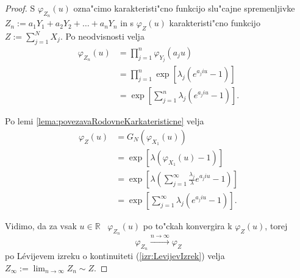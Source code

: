 \documentclass[12pt, a4paper, reqno]{amsart}
\theoremstyle{definition}
\theoremstyle{plain}
\newcommand{\R}{\mathbb{R}}
\newcommand{\1}{\mathds{1}}
\begin{document}
    \begin{proof}
        S $\varphi_{Z_n}(u)$ ozna"cimo karakteristi"cno funkcijo slu"cajne spremenljivke 
        $Z_n := a_1Y_1 + a_2Y_2 + \dots + a_nY_n$ in s $\varphi_{Z}(u)$ karakteristi"cno funkcijo
        $Z:= \sum_{j=1}^{N}X_j$. Po neodvisnosti velja
        \begin{align*}
            \varphi_{Z_n}(u) 
                    &= \prod_{j=1}^{n}\varphi_{Y_j}(a_ju)\\
                    &= \prod_{j=1}^{n}\exp\left[\lambda_j\left(e^{a_j i u} - 1\right)\right] \\
                    &= \exp\left[\sum_{j=1}^{n}\lambda_j\left(e^{a_j i u} - 1\right)\right].
        \end{align*}

        \noindent
        Po lemi \ref{lema:povezavaRodovneKarkateristicne} velja
        \begin{align*}
            \varphi_{Z}(u) 
                    &= G_N\left(\varphi_{X_1}(u)\right) \\
                    &= \exp\left[\lambda\left(\varphi_{X_1}(u) - 1\right)\right] \\
                    & = \exp\left[\lambda\left(\sum_{j=1}^\infty\frac{\lambda_j}{\lambda}e^{a_jiu} - 1\right)\right]\\
                    &= \exp\left[\sum_{j=1}^{\infty}\lambda_j\left(e^{a_j i u} - 1\right)\right].
        \end{align*}

        \noindent 
        Vidimo, da za vsak $u\in\R$ \ $\varphi_{Z_n}(u)$ po to"ckah konvergira k $\varphi_{Z}(u)$, torej
        \begin{equation*}
            \varphi_{Z_n} \xrightarrow{n\to\infty}\varphi_Z
        \end{equation*}
        po Lévijevem izreku o kontinuiteti (\ref{izr:LevijevIzrek}) velja $Z_\infty :=\lim_{n\to\infty}Z_n \sim Z$.
    \end{proof}
\end{document}
